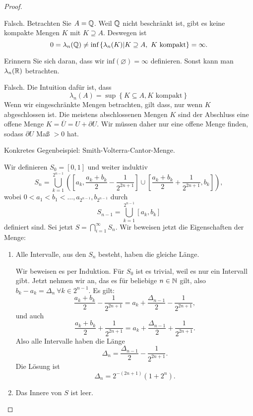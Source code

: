 \begin{proof}
	\begin{parts}
	\item Falsch. Betrachten Sie $A=\mathbb{Q}$. Weil $\mathbb{Q}$ nicht beschränkt ist, gibt es keine kompakte Mengen $K$ mit $K\supseteq A$. Deswegen ist 
		\[0=\lambda_n(\mathbb{Q})\neq\text{inf}\left\{ \lambda_n(K)|K\supseteq A,~K\text{ kompakt} \right\}=\infty.\] 
		\begin{tcolorbox}[title=Bemerkung]
			Erinnern Sie sich daran, dass wir $\text{inf}(\varnothing)=\infty$ definieren. Sonst kann man $\lambda_n(\mathbb{R})$ betrachten.
		\end{tcolorbox}
	\item Falsch. Die Intuition dafür ist, dass
		\[\lambda_n(A)=\sup\left\{K\subseteq A, K\text{ kompakt}  \right\} \]
		Wenn wir eingeschränkte Mengen betrachten, gilt dass, nur wenn $K$ abgeschlossen ist. Die meistens abschlossenen Mengen $K$ sind der Abschluss eine offene Menge $K=\overline{U}=U+\partial U$. Wir müssen daher nur eine offene Menge finden, sodass $\partial U$ Maß $>0$ hat.

		Konkretes Gegenbeispiel: Smith-Volterra-Cantor-Menge.

		Wir definieren $S_0=[0,1]$ und weiter induktiv
\[
	S_n=\bigcup_{k=1}^{2^{n-1}}\left(\left[a_k,\frac{a_k+b_k}{2}-\frac{1}{2^{2n+1}}\right]\cup \left[ \frac{a_k+b_k}{2}+\frac{1}{2^{2n+1}},b_k \right]   \right) 
,\] 
wobei $0<a_1<b_1<\dots, a_{2^{n-1}},b_{2^{n-1}}$ durch
\[
	S_{n-1}=\bigcup_{k=1}^{2^{n-1}}[a_k,b_k]
\] 
definiert sind. Sei jetzt $S=\bigcap_{i=1}^\infty S_n$. Wir beweisen jetzt die Eigenschaften der Menge:
\begin{enumerate}[label=(\roman*)]
	\item Alle Intervalle, aus den $S_n$ besteht, haben die gleiche Länge.

		Wir beweisen es per Induktion. F\"{u}r $S_0$ ist es trivial, weil es nur ein Intervall gibt. Jetzt nehmen wir an, das es f\"{u}r beliebige $n\in \mathbb{N}$ gilt, also $b_k-a_k=\Delta_n~\forall k\in 2^{n-1}$. Es gilt:
		\[
			\frac{a_k+b_k}{2}-\frac{1}{2^{2n+1}}=a_k+\frac{\Delta_{n-1}}{2}-\frac{1}{2^{2n+1}}
		,\] 
		und auch
		\[
			\frac{a_k+b_k}{2}+\frac{1}{2^{2n+1}}=a_k+\frac{\Delta_{n-1}}{2}+\frac{1}{2^{2n+1}}
		.\] 
Also alle Intervalle haben die Länge
\[
	\Delta_{n}=\frac{\Delta_{n-1}}{2}-\frac{1}{2^{2n+1}}
.\] 
Die Lösung ist
\[
	\Delta_n=2^{-(2n+1)}(1+2^n)
.\] 
\item Das Innere von $S$ ist leer. 


\end{enumerate}
\end{parts}
\end{proof}
